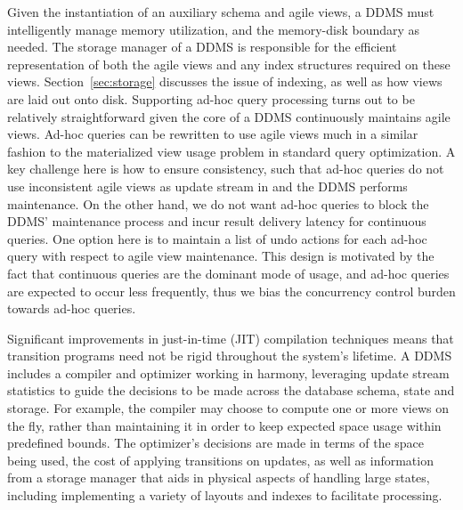 Given the instantiation of an auxiliary schema and agile views, a DDMS must
intelligently manage memory utilization, and the memory-disk boundary as needed. The
storage manager of a DDMS is responsible for the efficient representation of
both the agile views and any index structures required on these views.
Section~\ref{sec:storage} discusses the issue of indexing, as well as how views
are laid out onto disk. Supporting ad-hoc query processing turns out to be
relatively straightforward given the core of a DDMS continuously maintains agile
views. Ad-hoc queries can be rewritten to use agile views much in a similar
fashion to the materialized view usage problem in standard query optimization. A
key challenge here is how to ensure consistency, such that ad-hoc queries do not
use inconsistent agile views as update stream in and the DDMS performs
maintenance. On the other hand, we do not want ad-hoc queries to block the DDMS'
maintenance process and incur result delivery latency for continuous queries.
One option here is to maintain a list of undo actions for each ad-hoc query with
respect to agile view maintenance. This design is motivated by the fact that
continuous queries are the dominant mode of usage, and ad-hoc queries are
expected to occur less frequently, thus we bias the concurrency control burden
towards ad-hoc queries.






Significant improvements in just-in-time (JIT) compilation techniques means that
transition programs need not be rigid throughout the system's lifetime. A DDMS
includes a compiler and optimizer working in harmony, leveraging update stream
statistics to guide the decisions to be made across the database schema, state
and storage. For example, the compiler may choose to compute one or more views
on the fly, rather than maintaining it in order to keep expected space usage
within predefined bounds. The optimizer's decisions are made in terms of the
space being used, the cost of applying transitions on updates, as well as
information from a storage manager that aids in physical aspects of handling
large states, including implementing a variety of layouts and indexes to
facilitate processing.










